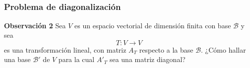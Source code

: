 
\subsection{}

\begin{frame}\frametitle{Problema de diagonalización }
	
	\begin{alertblock}{\textbf{Observación 2 }}\justifying 
		Sea $V$ es un espacio vectorial de dimensión finita con base $\mathcal{B}$ y sea
		\[
			T:V\to V
		\]
		es una transformación lineal, con matriz $A_T$ respecto a la base $\mathcal{B}$. ¿Cómo hallar una base
		$\mathcal{B}'$ de $V$ para la cual ${A'}_T$ sea una matriz diagonal?		
	\end{alertblock}
	
	
\end{frame}

%
%
%
%	
%	
%	

